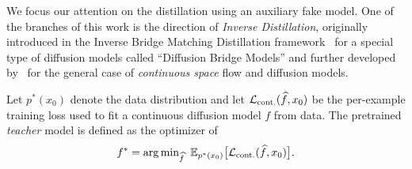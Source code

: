   We focus our attention on the distillation using an auxiliary fake model. One of the branches of this work is the direction of 
  \textit{Inverse Distillation}, originally introduced in the Inverse Bridge Matching Distillation framework~\citep{gushchin2025inverse} for a special type of diffusion models called ``Diffusion Bridge Models'' and further developed by~\citet{kornilov2025universal} for the general case of \textit{continuous space} flow and diffusion models. 

  Let $p^*(x_0)$ denote the data distribution and let $\mathcal{L}_{\text{cont.}}(\widehat{f}, x_0)$ be the per-example training loss
  used to fit a continuous diffusion model $f$ from data.
  The pretrained \emph{teacher} model is defined as the optimizer of
  \begin{equation}
    f^* = \arg\min\nolimits_{\widehat{f}} \ \mathbb{E}_{p^*(x_0)}\big[ \mathcal{L}_{\text{cont.}}(\widehat{f},
    x_0)\big].
    \label{eq:teacher_objective_cont}
  \end{equation}

